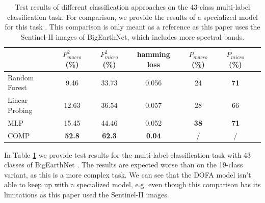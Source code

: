 \begin{table}[h]
  \centering
  \begin{tabular}{lcccccc}
    \textbf{} & \textbf{$F^2_{macro}$ (\%)} & \textbf{$F^2_{micro}$ (\%)} & \textbf{hamming loss} & \textbf{$P_{macro}$ (\%)} & \textbf{$P_{micro}$ (\%)} \\
    \hline
    Random Forest & 9.46 & 33.73 & 0.056 & 24 & \textbf{71} \\
    Linear Probing & 12.63 & 36.54 & 0.057 & 28 & 66 \\
    MLP & 15.45 & 44.46 & 0.052 & \textbf{38} & \textbf{71} \\
    \hline
    COMP \cite{bigearthnet-comparison-model} & \textbf{52.8} & \textbf{62.3} & \textbf{0.04} & / & / \\
  \end{tabular}
  \caption{Test results of different classification approaches on the 43-class multi-label classification task. For comparison, we provide the results of a specialized model for this task \cite{bigearthnet-comparison-model}. This comparison is only meant as a reference as this paper uses the Sentinel-II images of BigEarthNet, which includes more spectral bands.}
  \label{fig:test-results-43}
\end{table}

In Table \ref{fig:test-results-43} we provide test results for the multi-label classification task with 43 classes of BigEarthNet \cite{bigearthnet}. The results are expected worse than on the 19-class variant, as this is a more complex task. We can see that the DOFA model isn't able to keep up with a specialized model, e.g. \cite{bigearthnet-comparison-model} even though this comparison has its limitations as this paper used the Sentinel-II images.


